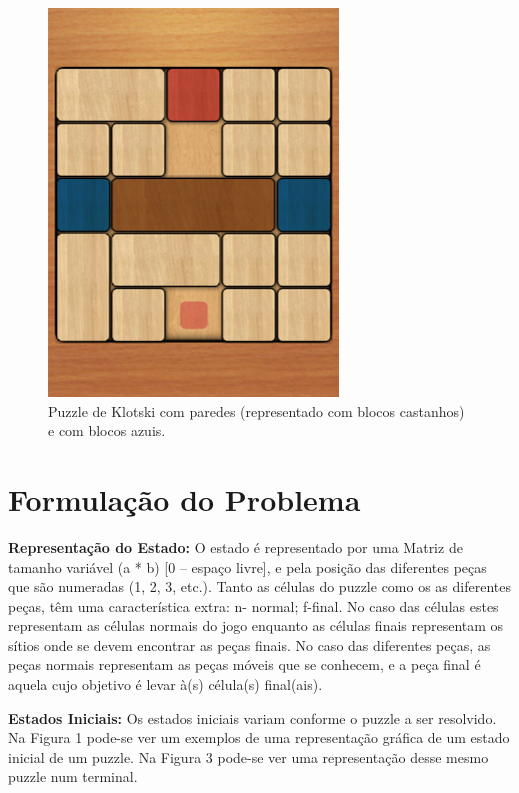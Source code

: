 \documentclass[conference]{IEEEtran}
\begin{document}
\begin{figure}
	\centering
	\includegraphics[width=0.75\linewidth]{klotski2.png}
	\caption{Puzzle de Klotski com paredes (representado com blocos castanhos) e com blocos azuis.}
	\label{fig:klotski2}
\end{figure}



\section{Formulação do Problema}
\textbf{Representação do Estado:} O estado é representado por uma Matriz de tamanho variável (a * b) [0 – espaço livre], e pela posição das diferentes peças que são numeradas (1, 2, 3, etc.). 
Tanto as células do puzzle como os as diferentes peças, têm uma característica extra: n- normal; f-final. No caso das células estes representam as células normais do jogo enquanto as células finais representam os sítios onde se devem encontrar as peças finais. No caso das diferentes peças, as peças normais representam as peças móveis que se conhecem, e a peça final é aquela cujo objetivo é levar à(s) célula(s) final(ais).

\textbf{Estados Iniciais:} Os estados iniciais variam conforme o puzzle a ser resolvido. Na Figura 1 pode-se ver um exemplos de uma representação gráfica de um estado inicial de um puzzle. Na Figura 3 pode-se ver uma representação desse mesmo puzzle num terminal.
\end{document}
